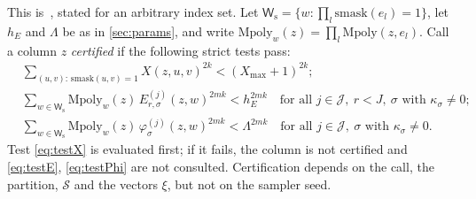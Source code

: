 \documentclass[11pt,letterpaper]{article}
\theoremstyle{definition}
\theoremstyle{remark}
\newcommand{\smask}{\mathrm{smask}}
\newcommand{\Mpoly}{\mathrm{Mpoly}}
\newcommand{\cS}{\mathcal S}
\newcommand{\cJ}{\mathcal J}
\newcommand{\Ws}{\mathsf W_{\mathrm s}}
\newcommand{\Xmax}{X_{\max}}
\begin{document}
This is~\cite[Lemma~5.3]{NagCG}, stated for an arbitrary index set.
Let \(\Ws=\{w:\prod_l\smask(e_l)=1\}\), let \(h_E\) and \(\Lambda\) be
as in \cref{sec:params}, and write
\(\Mpoly_w(z)=\prod_l\Mpoly(z,e_l)\). Call a column \(z\)
\emph{certified} if the following strict tests pass:
\begin{align}
 &\textstyle\sum_{(u,v):\,\smask(u,v)=1}X(z,u,v)^{2k}<(\Xmax+1)^{2k};\label{eq:testX}\\
 &\textstyle\sum_{w\in\Ws}\Mpoly_w(z)\,E^{(j)}_{r,\sigma}(z,w)^{2mk}<h_E^{2mk}
   \quad\text{for all }j\in\cJ,\ r<J,\ \sigma\text{ with }\kappa_\sigma\ne0;\label{eq:testE}\\
 &\textstyle\sum_{w\in\Ws}\Mpoly_w(z)\,\varphi^{(j)}_\sigma(z,w)^{2mk}<\Lambda^{2mk}
   \quad\text{for all }j\in\cJ,\ \sigma\text{ with }\kappa_\sigma\ne0.\label{eq:testPhi}
\end{align}
Test \eqref{eq:testX} is evaluated first; if it fails, the column is
not certified and \eqref{eq:testE}, \eqref{eq:testPhi} are not
consulted. Certification depends on the call, the partition, \(\cS\)
and the vectors \(\xi\), but not on the sampler seed.
\end{document}
